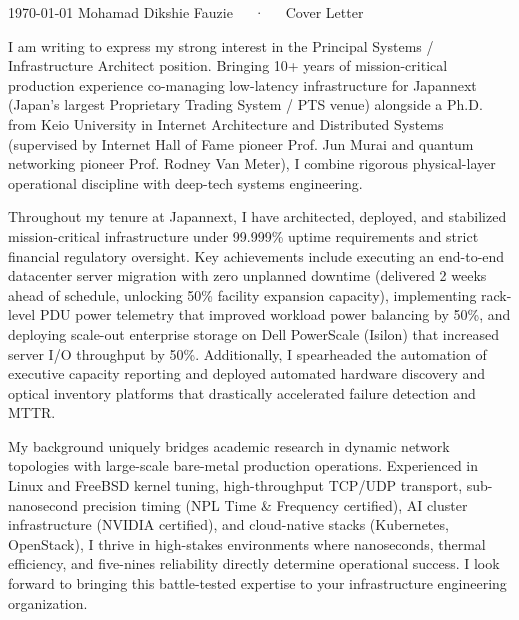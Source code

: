 \documentclass[11pt, a4paper]{awesome-cv}
\begin{document}
\makecvheader[R]

\makecvfooter
  {\today}
  {Mohamad Dikshie Fauzie~~~·~~~Cover Letter}
  {}

\makelettertitle

\begin{cvletter}

I am writing to express my strong interest in the Principal Systems / Infrastructure Architect position. Bringing 10+ years of mission-critical production experience co-managing low-latency infrastructure for Japannext (Japan's largest Proprietary Trading System / PTS venue) alongside a Ph.D. from Keio University in Internet Architecture and Distributed Systems (supervised by Internet Hall of Fame pioneer Prof. Jun Murai and quantum networking pioneer Prof. Rodney Van Meter), I combine rigorous physical-layer operational discipline with deep-tech systems engineering.

Throughout my tenure at Japannext, I have architected, deployed, and stabilized mission-critical infrastructure under 99.999\% uptime requirements and strict financial regulatory oversight. Key achievements include executing an end-to-end datacenter server migration with zero unplanned downtime (delivered 2 weeks ahead of schedule, unlocking 50\% facility expansion capacity), implementing rack-level PDU power telemetry that improved workload power balancing by 50\%, and deploying scale-out enterprise storage on Dell PowerScale (Isilon) that increased server I/O throughput by 50\%. Additionally, I spearheaded the automation of executive capacity reporting and deployed automated hardware discovery and optical inventory platforms that drastically accelerated failure detection and MTTR.

My background uniquely bridges academic research in dynamic network topologies with large-scale bare-metal production operations. Experienced in Linux and FreeBSD kernel tuning, high-throughput TCP/UDP transport, sub-nanosecond precision timing (NPL Time \& Frequency certified), AI cluster infrastructure (NVIDIA certified), and cloud-native stacks (Kubernetes, OpenStack), I thrive in high-stakes environments where nanoseconds, thermal efficiency, and five-nines reliability directly determine operational success. I look forward to bringing this battle-tested expertise to your infrastructure engineering organization.

\end{cvletter}


\makeletterclosing
\end{document}
